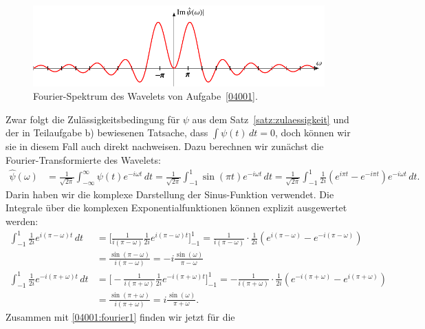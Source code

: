 \begin{loesung}
\begin{teilaufgaben}
\begin{figure}
\includegraphics{chapters/uebungsaufgaben/04001-spektrum.pdf}
\caption{Fourier-Spektrum des Wavelets von Aufgabe~\ref{04001}.
\label{04001:spektrum}}
\end{figure}
\item
Zwar folgt die Zulässigkeitsbedingung für $\psi$ aus dem
Satz~\ref{satz:zulaessigkeit} und der in Teilaufgabe b) bewiesenen
Tatsache, dass $\int \psi(t)\,dt=0$, doch können wir sie in diesem Fall
auch direkt nachweisen.
Dazu berechnen wir zunächst die Fourier-Transformierte des Wavelets:
\begin{align}
\hat{\psi}(\omega)
&=
\frac{1}{\sqrt{2\pi}}
\int_{-\infty}^\infty \psi(t)e^{-i\omega t}\,dt
=
\frac{1}{\sqrt{2\pi}}
\int_{-1}^{1} \sin(\pi t)e^{-i\omega t}\,dt
=
\frac{1}{\sqrt{2\pi}}
\int_{-1}^1
\frac1{2i} (e^{i\pi t}-e^{-i\pi t})e^{-i\omega t}\,dt.
\label{04001:fourier1}
\end{align}
Darin haben wir die komplexe Darstellung der Sinus-Funktion verwendet.
Die Integrale über die komplexen Exponentialfunktionen können explizit
ausgewertet werden:
\begin{align*}
\int_{-1}^1 \frac{1}{2i}e^{i(\pi-\omega)t}\,dt
&=
\biggl[
\frac{1}{i(\pi-\omega)}
\frac1{2i}
e^{i(\pi-\omega)t}
\biggr]_{-1}^1
=
\frac{1}{i(\pi-\omega)}
\cdot
\frac1{2i}(e^{i(\pi-\omega)}-e^{-i(\pi-\omega)})
\\
&=
\frac{\sin(\pi-\omega)}{i(\pi-\omega)}
=
-i\frac{\sin(\omega)}{\pi-\omega}
\\
\int_{-1}^1 \frac{1}{2i}e^{-i(\pi+\omega)t}\,dt
&=
\biggl[
-\frac{1}{i(\pi+\omega)}
\frac1{2i}
e^{-i(\pi+\omega)t}
\biggr]_{-1}^1
=
-\frac{1}{i(\pi+\omega)}
\cdot
\frac1{2i}(e^{-i(\pi+\omega)}-e^{i(\pi+\omega)})
\\
&=
\frac{\sin(\pi+\omega)}{i(\pi+\omega)}
=
i\frac{\sin(\omega)}{\pi+\omega}.
\end{align*}
Zusammen mit \eqref{04001:fourier1} finden wir jetzt für die

\end{teilaufgaben}
\end{loesung}
